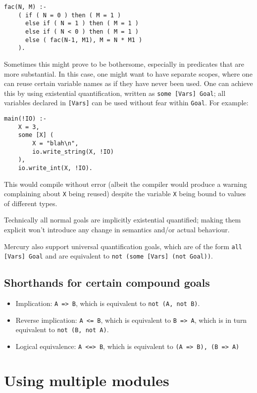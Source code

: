 \begin{lstlisting}[language=Mercury]
fac(N, M) :-
	( if ( N = 0 ) then ( M = 1 )
	  else if ( N = 1 ) then ( M = 1 )
	  else if ( N < 0 ) then ( M = 1 )
	  else ( fac(N-1, M1), M = N * M1 )
	).
\end{lstlisting}

Sometimes this might prove to be bothersome, especially in predicates that are more substantial. In this case, one might want to have separate scopes, where one can reuse certain variable names as if they have never been used. One can achieve this by using existential quantification, written as \texttt{some [Vars] Goal}; all variables declared in \texttt{[Vars]} can be used without fear within \texttt{Goal}. For example:

\begin{lstlisting}[language=Mercury]
main(!IO) :-
	X = 3,
	some [X] (
		X = "blah\n",
		io.write_string(X, !IO)
	),
	io.write_int(X, !IO).
\end{lstlisting}

This would compile without error (albeit the compiler would produce a warning complaining about \texttt{X} being reused) despite the variable \texttt{X} being bound to values of different types.

Technically all normal goals are implicitly existential quantified; making them explicit won't introduce any change in semantics and/or actual behaviour.

Mercury also support universal quantification goals, which are of the form \texttt{all [Vars] Goal} and are equivalent to \texttt{not (some [Vars] (not Goal))}.

\subsection{Shorthands for certain compound goals}

\begin{itemize}
\item Implication: \texttt{A => B}, which is equivalent to \texttt{not (A, not B)}.
\item Reverse implication: \texttt{A <= B}, which is equivalent to \texttt{B => A}, which is in turn equivalent to \texttt{not (B, not A)}.
  \item Logical equivalence: \texttt{A <=> B}, which is equivalent to \texttt{(A => B), (B => A)}
\end{itemize}


\section{Using multiple modules}

